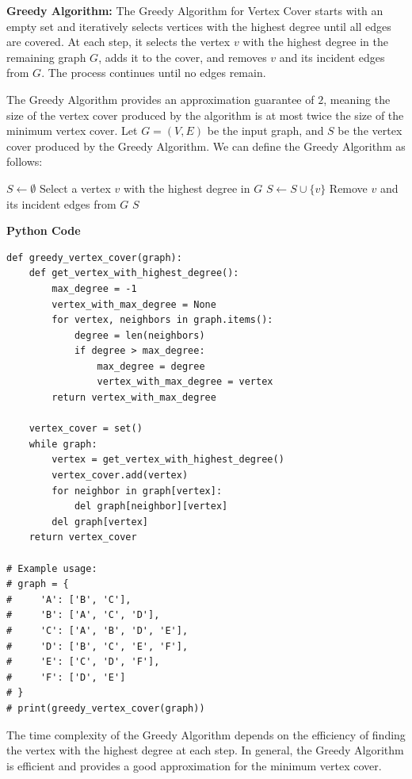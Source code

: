 \documentclass[12pt]{book} %
\begin{document}
\textbf{Greedy Algorithm:} The Greedy Algorithm for Vertex Cover starts with an empty set and iteratively selects vertices with the highest degree until all edges are covered. At each step, it selects the vertex \(v\) with the highest degree in the remaining graph \(G\), adds it to the cover, and removes \(v\) and its incident edges from \(G\). The process continues until no edges remain.

The Greedy Algorithm provides an approximation guarantee of \(2\), meaning the size of the vertex cover produced by the algorithm is at most twice the size of the minimum vertex cover. Let \(G = (V, E)\) be the input graph, and \(S\) be the vertex cover produced by the Greedy Algorithm. We can define the Greedy Algorithm as follows:
\FloatBarrier
\begin{algorithm}
\caption{Greedy Vertex Cover}
\begin{algorithmic}[1]
\State $S \gets \emptyset$
    \State Select a vertex $v$ with the highest degree in $G$
    \State $S \gets S \cup \{v\}$
    \State Remove $v$ and its incident edges from $G$
\EndWhile
\State \Return $S$
\EndFunction
\end{algorithmic}
\end{algorithm}
\FloatBarrier

\textbf{Python Code}
\FloatBarrier
\begin{lstlisting}
def greedy_vertex_cover(graph):
    def get_vertex_with_highest_degree():
        max_degree = -1
        vertex_with_max_degree = None
        for vertex, neighbors in graph.items():
            degree = len(neighbors)
            if degree > max_degree:
                max_degree = degree
                vertex_with_max_degree = vertex
        return vertex_with_max_degree
    
    vertex_cover = set()
    while graph:
        vertex = get_vertex_with_highest_degree()
        vertex_cover.add(vertex)
        for neighbor in graph[vertex]:
            del graph[neighbor][vertex]
        del graph[vertex]
    return vertex_cover

# Example usage:
# graph = {
#     'A': ['B', 'C'],
#     'B': ['A', 'C', 'D'],
#     'C': ['A', 'B', 'D', 'E'],
#     'D': ['B', 'C', 'E', 'F'],
#     'E': ['C', 'D', 'F'],
#     'F': ['D', 'E']
# }
# print(greedy_vertex_cover(graph))
\end{lstlisting}
\FloatBarrier
The time complexity of the Greedy Algorithm depends on the efficiency of finding the vertex with the highest degree at each step. In general, the Greedy Algorithm is efficient and provides a good approximation for the minimum vertex cover.
\end{document}
